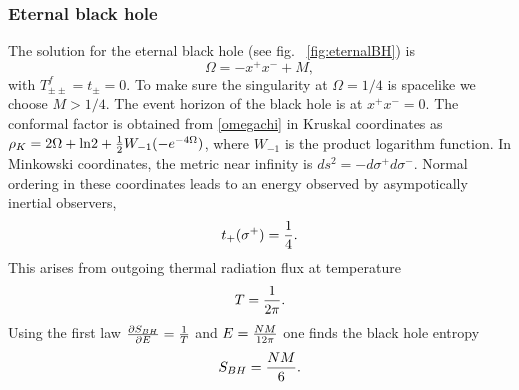 \documentclass[11pt,oneside,letterpaper]{article}
\newcommand{\f}{\frac}
\newcommand{\be}{\begin{equation}}
\newcommand{\ee}{\end{equation}}
\def\be{\begin{eqnarray}}
\def\ee{\end{eqnarray}}
\let\s=\sigma \let\t=\tau \let\u=\upsilon \let\c=\chi
\let\f=\frac
\def\be{\begin{equation}}
\def\ee{\end{equation}}
\def\del{\partial}
\def\m{{M}}
\def\log{{\rm ln}}
\numberwithin{equation}{section}
\def \be {\begin{equation}}
\def \ee {\end{equation}}
\begin{document}
 \subsubsection{Eternal black hole}




The solution for the eternal black hole  (see fig. ~\ref{fig:eternalBH}) is
\be\label{eternalomega}
\Omega = - x^+ x^- + \m ,
\ee 
with  $T^{f}_{\pm \pm} =t_\pm =0$. To make sure the singularity at $\Omega = 1/4$ is spacelike we choose $\m > 1/4$. The event horizon of the black hole is at $x^+ x^- = 0$. The conformal factor is obtained from \eqref{omegachi} in Kruskal coordinates as $\rho_K = 2\Omega + \log 2 + \f 1 2 W_{-1}(-e^{-4\Omega})$, where $W_{-1}$ is the product logarithm function. In Minkowski coordinates, the metric near infinity is $ds^2 = -d\s^+ d\s^-$. Normal ordering in these coordinates leads to an energy observed by asympotically inertial observers,
\be\label{tyl} t_+(\s^+)={1 \over 4}.\ee
This arises from outgoing thermal radiation flux at temperature 
\be T={1 \over 2 \pi}.\ee
Using the first law ${\del S_{BH}\over \del E}={1 \over T}$ and $E={N\m \over 12\pi}$
one finds the black hole entropy
\be S_{BH}={N\m \over 6}.\ee
\end{document}
